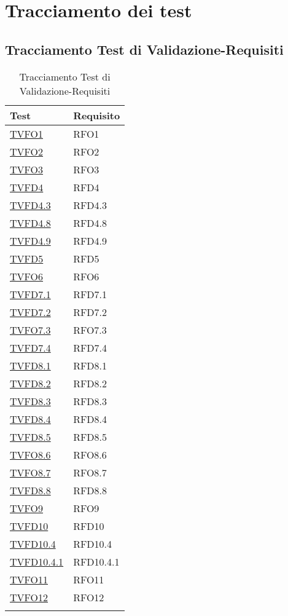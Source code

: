 \section{Tracciamento dei test}

\subsection{Tracciamento Test di Validazione-Requisiti}
\normalsize
\begin{longtable}[ht]{|>{\centering}m{5cm}|m{5cm}<{\centering}|}
\hline 
\textbf{Test} & \textbf{Requisito}\\
\hline
\endhead
\hyperlink{TVFO1}{TVFO1} & RFO1\\ \hline
\hyperlink{TVFO2}{TVFO2} & RFO2\\ \hline
\hyperlink{TVFO3}{TVFO3} & RFO3\\ \hline
\hyperlink{TVFD4}{TVFD4} & RFD4\\ \hline
\hyperlink{TVFD4.3}{TVFD4.3} & RFD4.3\\ \hline
\hyperlink{TVFD4.8}{TVFD4.8} & RFD4.8\\ \hline
\hyperlink{TVFD4.9}{TVFD4.9} & RFD4.9\\ \hline
\hyperlink{TVFD5}{TVFD5} & RFD5\\ \hline
\hyperlink{TVFO6}{TVFO6} & RFO6\\ \hline
\hyperlink{TVFD7.1}{TVFD7.1} & RFD7.1\\ \hline
\hyperlink{TVFD7.2}{TVFD7.2} & RFD7.2\\ \hline
\hyperlink{TVFO7.3}{TVFO7.3} & RFO7.3\\ \hline
\hyperlink{TVFD7.4}{TVFD7.4} & RFD7.4\\ \hline
\hyperlink{TVFD8.1}{TVFD8.1} & RFD8.1\\ \hline
\hyperlink{TVFD8.2}{TVFD8.2} & RFD8.2\\ \hline
\hyperlink{TVFD8.3}{TVFD8.3} & RFD8.3\\ \hline
\hyperlink{TVFD8.4}{TVFD8.4} & RFD8.4\\ \hline
\hyperlink{TVFD8.5}{TVFD8.5} & RFD8.5\\ \hline
\hyperlink{TVFO8.6}{TVFO8.6} & RFO8.6\\ \hline
\hyperlink{TVFO8.7}{TVFO8.7} & RFO8.7\\ \hline
\hyperlink{TVFD8.8}{TVFD8.8} & RFD8.8\\ \hline
\hyperlink{TVFO9}{TVFO9} & RFO9\\ \hline
\hyperlink{TVFD10}{TVFD10} & RFD10\\ \hline
\hyperlink{TVFD10.4}{TVFD10.4} & RFD10.4\\ \hline
\hyperlink{TVFD10.4.1}{TVFD10.4.1} & RFD10.4.1\\ \hline
\hyperlink{TVFO11}{TVFO11} & RFO11\\ \hline
\hyperlink{TVFO12}{TVFO12} & RFO12\\ \hline 
\caption[Tracciamento Test di Validazione-Requisiti]{Tracciamento Test di Validazione-Requisiti}
\label{tabella:tv-requi}
\end{longtable}
\clearpage

